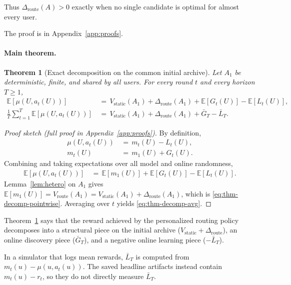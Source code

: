 \documentclass{article} %
\newtheorem{theorem}{Theorem}
\providecommand{\E}{\mathbb{E}}
\begin{document}
Thus \(\Delta_{\mathrm{route}}(A)>0\) exactly when no single candidate is
optimal for almost every user.

The proof is in Appendix~\ref{app:proofs}.

\paragraph{Main theorem.}

\label{sec:method-thm-decomp}

\begin{theorem}[Exact decomposition on the common initial archive]
\label{thm:decomp}
Let $A_1$ be deterministic, finite, and shared by all users. For every round $t$ and every horizon $T \ge 1$,
\begin{align}
\E[\mu(U, a_t(U))]
&\,=\, V_{\mathrm{static}}(A_1) + \Delta_{\mathrm{route}}(A_1) + \E[G_t(U)] - \E[L_t(U)],
\label{eq:thm-decomp-pointwise}\\
\frac{1}{T}\sum_{t=1}^T \E[\mu(U, a_t(U))]
&\,=\, V_{\mathrm{static}}(A_1) + \Delta_{\mathrm{route}}(A_1) + \bar G_T - \bar L_T.
\label{eq:thm-decomp-avg}
\end{align}
\end{theorem}

\begin{proof}[Proof sketch (full proof in Appendix~\ref{app:proofs})]
By definition,
\begin{align*}
\mu(U, a_t(U)) &\,=\, m_t(U) - L_t(U), \\
m_t(U) &\,=\, m_1(U) + G_t(U).
\end{align*}
Combining and taking expectations over all model and online randomness,
\begin{align*}
\E[\mu(U, a_t(U))] &\,=\, \E[m_1(U)] + \E[G_t(U)] - \E[L_t(U)].
\end{align*}
Lemma~\ref{lem:hetero} on $A_1$ gives $\E[m_1(U)] = V_{\mathrm{route}}(A_1) = V_{\mathrm{static}}(A_1) + \Delta_{\mathrm{route}}(A_1)$, which is \eqref{eq:thm-decomp-pointwise}. Averaging over $t$ yields \eqref{eq:thm-decomp-avg}.
\end{proof}

Theorem~\ref{thm:decomp} says that the reward achieved by the personalized routing policy decomposes into a structural piece on the initial archive ($V_{\mathrm{static}}+\Delta_{\mathrm{route}}$), an online discovery piece ($\bar G_T$), and a negative online learning piece ($-\bar L_T$).

In a simulator that logs mean rewards, \(\bar L_T\) is computed from
\(m_t(u)-\mu(u,a_t(u))\). The saved headline artifacts instead contain
\(m_t(u)-r_t\), so they do not directly measure \(\bar L_T\).
\end{document}
